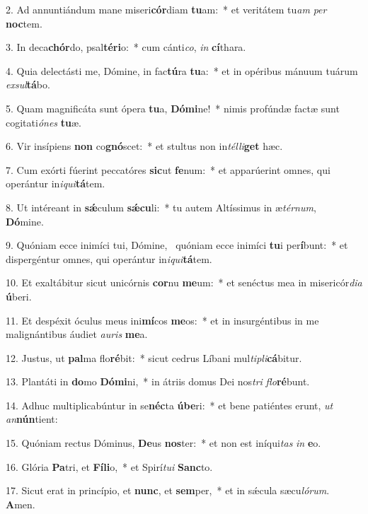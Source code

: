 2. Ad annuntiándum mane miseri\textbf{cór}diam \textbf{tu}am:~*  et veritátem tu\textit{am} \textit{per} \textbf{noc}tem.\

3. In deca\textbf{chór}do, psal\textbf{té}\textbf{ri}o:~*  cum cánti\textit{co}, \textit{in} \textbf{cí}thara.\

4. Quia delectásti me, Dómine, in fac\textbf{tú}ra \textbf{tu}a:~*  et in opéribus mánuum tuárum \textit{ex}\textit{sul}\textbf{tá}bo.\

5. Quam magnificáta sunt ópera \textbf{tu}a, \textbf{Dó}\textbf{mi}ne!~*  nimis profúndæ factæ sunt cogitati\textit{ó}\textit{nes} \textbf{tu}æ.\

6. Vir insípiens \textbf{non} co\textbf{gnó}scet:~*  et stultus non in\textit{tél}\textit{li}\textbf{get} hæc.\

7. Cum exórti fúerint peccatóres \textbf{sic}ut \textbf{fe}num:~*  et apparúerint omnes, qui operántur in\textit{i}\textit{qui}\textbf{tá}tem.\

8. Ut intéreant in \textbf{sǽ}culum \textbf{sǽ}\textbf{cu}li:~*  tu autem Altíssimus in æ\textit{tér}\textit{num}, \textbf{Dó}mine.\

9. Quóniam ecce inimíci tui, Dómine, \dag\  quóniam ecce inimíci \textbf{tu}i per\textbf{í}bunt:~*  et dispergéntur omnes, qui operántur in\textit{i}\textit{qui}\textbf{tá}tem.\

10. Et exaltábitur sicut unicórnis \textbf{cor}nu \textbf{me}um:~*  et senéctus mea in misericór\textit{di}\textit{a} \textbf{ú}beri.\

11. Et despéxit óculus meus ini\textbf{mí}cos \textbf{me}os:~*  et in insurgéntibus in me malignántibus áudiet \textit{au}\textit{ris} \textbf{me}a.\

12. Justus, ut \textbf{pal}ma flo\textbf{ré}bit:~*  sicut cedrus Líbani mul\textit{ti}\textit{pli}\textbf{cá}bitur.\

13. Plantáti in \textbf{do}mo \textbf{Dó}\textbf{mi}ni,~*  in átriis domus Dei nos\textit{tri} \textit{flo}\textbf{ré}bunt.\

14. Adhuc multiplicabúntur in se\textbf{néc}ta \textbf{ú}\textbf{be}ri:~*  et bene patiéntes erunt, \textit{ut} \textit{an}\textbf{nún}tient:\

15. Quóniam rectus Dóminus, \textbf{De}us \textbf{nos}ter:~*  et non est iníqui\textit{tas} \textit{in} \textbf{e}o.\

16. Glória \textbf{Pa}tri, et \textbf{Fí}\textbf{li}o,~*  et Spirí\textit{tu}\textit{i} \textbf{Sanc}to.\

17. Sicut erat in princípio, et \textbf{nunc}, et \textbf{sem}per,~*  et in sǽcula sæcu\textit{ló}\textit{rum}. \textbf{A}men.\

